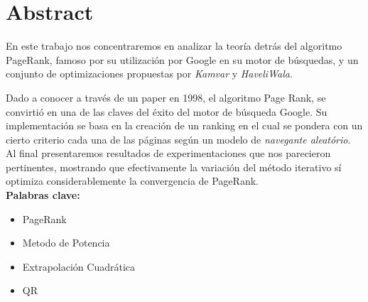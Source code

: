 \section{Abstract}

En este trabajo nos concentraremos en analizar la teoría detrás del algoritmo PageRank, famoso por su utilización por
Google en su motor de búsquedas, y un conjunto de optimizaciones propuestas por \textit{Kamvar} y \textit{HaveliWala}.

Dado a conocer a través de un paper en 1998, el algoritmo Page Rank, se convirtió en una de las claves del
éxito del motor de búsqueda Google. Su implementación se basa en la creación de un ranking en el cual se pondera
con un cierto criterio cada una de las páginas según un modelo de \textit{navegante aleatório}.\\

Al final presentaremos resultados de experimentaciones que nos parecieron pertinentes, mostrando que efectivamente
la variación del método iterativo sí optimiza considerablemente la convergencia de PageRank.\\

{\bf Palabras clave:}
\begin{itemize} 
    \item PageRank
    \item Metodo de Potencia
    \item Extrapolación Cuadrática
    \item QR
\end{itemize}
